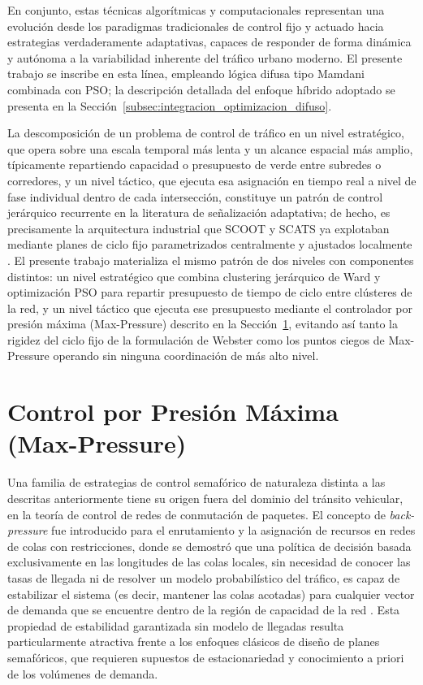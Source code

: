 En conjunto, estas técnicas algorítmicas y computacionales representan una evolución desde los paradigmas tradicionales de control fijo y actuado hacia estrategias verdaderamente adaptativas, capaces de responder de forma dinámica y autónoma a la variabilidad inherente del tráfico urbano moderno. El presente trabajo se inscribe en esta línea, empleando lógica difusa tipo Mamdani combinada con PSO; la descripción detallada del enfoque híbrido adoptado se presenta en la Sección~\ref{subsec:integracion_optimizacion_difuso}.

La descomposición de un problema de control de tráfico en un nivel estratégico, que opera sobre una escala temporal más lenta y un alcance espacial más amplio, típicamente repartiendo capacidad o presupuesto de verde entre subredes o corredores, y un nivel táctico, que ejecuta esa asignación en tiempo real a nivel de fase individual dentro de cada intersección, constituye un patrón de control jerárquico recurrente en la literatura de señalización adaptativa; de hecho, es precisamente la arquitectura industrial que SCOOT y SCATS ya explotaban mediante planes de ciclo fijo parametrizados centralmente y ajustados localmente \cite{hunt1982scoot,sims1980scats}. El presente trabajo materializa el mismo patrón de dos niveles con componentes distintos: un nivel estratégico que combina clustering jerárquico de Ward y optimización PSO para repartir presupuesto de tiempo de ciclo entre clústeres de la red, y un nivel táctico que ejecuta ese presupuesto mediante el controlador por presión máxima (Max-Pressure) descrito en la Sección~\ref{subsec:max_pressure}, evitando así tanto la rigidez del ciclo fijo de la formulación de Webster como los puntos ciegos de Max-Pressure operando sin ninguna coordinación de más alto nivel.




\section{Control por Presión Máxima (Max-Pressure)}
\label{subsec:max_pressure}

Una familia de estrategias de control semafórico de naturaleza distinta a las descritas anteriormente tiene su origen fuera del dominio del tránsito vehicular, en la teoría de control de redes de conmutación de paquetes. El concepto de \emph{back-pressure} fue introducido para el enrutamiento y la asignación de recursos en redes de colas con restricciones, donde se demostró que una política de decisión basada exclusivamente en las longitudes de las colas locales, sin necesidad de conocer las tasas de llegada ni de resolver un modelo probabilístico del tráfico, es capaz de estabilizar el sistema (es decir, mantener las colas acotadas) para cualquier vector de demanda que se encuentre dentro de la región de capacidad de la red \cite{tassiulas1992stability}. Esta propiedad de estabilidad garantizada sin modelo de llegadas resulta particularmente atractiva frente a los enfoques clásicos de diseño de planes semafóricos, que requieren supuestos de estacionariedad y conocimiento a priori de los volúmenes de demanda.


